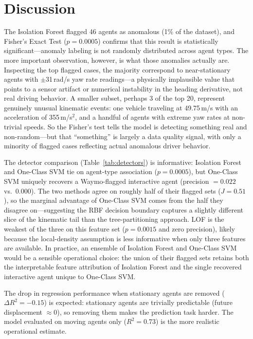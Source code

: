 \documentclass[conference]{IEEEtran}
\begin{document}
\section{Discussion}

The Isolation Forest flagged 46 agents as anomalous (1\% of the dataset), and Fisher's Exact Test ($p = 0.0005$) confirms that this result is statistically significant---anomaly labeling is not randomly distributed across agent types. The more important observation, however, is what those anomalies actually are. Inspecting the top flagged cases, the majority correspond to near-stationary agents with $\pm$31\,rad/s yaw rate readings---a physically implausible value that points to a sensor artifact or numerical instability in the heading derivative, not real driving behavior. A smaller subset, perhaps 3 of the top 20, represent genuinely unusual kinematic events: one vehicle traveling at 49.75\,m/s with an acceleration of 355\,m/s$^2$, and a handful of agents with extreme yaw rates at non-trivial speeds. So the Fisher's test tells the model is detecting something real and non-random---but that ``something'' is largely a data quality signal, with only a minority of flagged cases reflecting actual anomalous driver behavior.

The detector comparison (Table~\ref{tab:detectors}) is informative: Isolation Forest and One-Class SVM tie on agent-type association ($p = 0.0005$), but One-Class SVM uniquely recovers a Waymo-flagged interactive agent (precision $= 0.022$ vs.\ $0.000$). The two methods agree on roughly half of their flagged sets ($J = 0.51$), so the marginal advantage of One-Class SVM comes from the half they disagree on---suggesting the RBF decision boundary captures a slightly different slice of the kinematic tail than the tree-partitioning approach. LOF is the weakest of the three on this feature set ($p = 0.0015$ and zero precision), likely because the local-density assumption is less informative when only three features are available. In practice, an ensemble of Isolation Forest and One-Class SVM would be a sensible operational choice: the union of their flagged sets retains both the interpretable feature attribution of Isolation Forest and the single recovered interactive agent unique to One-Class SVM.

The drop in regression performance when stationary agents are removed ($\Delta R^2 = -0.15$) is expected: stationary agents are trivially predictable (future displacement $\approx 0$), so removing them makes the prediction task harder. The model evaluated on moving agents only ($R^2 = 0.73$) is the more realistic operational estimate.
\end{document}
